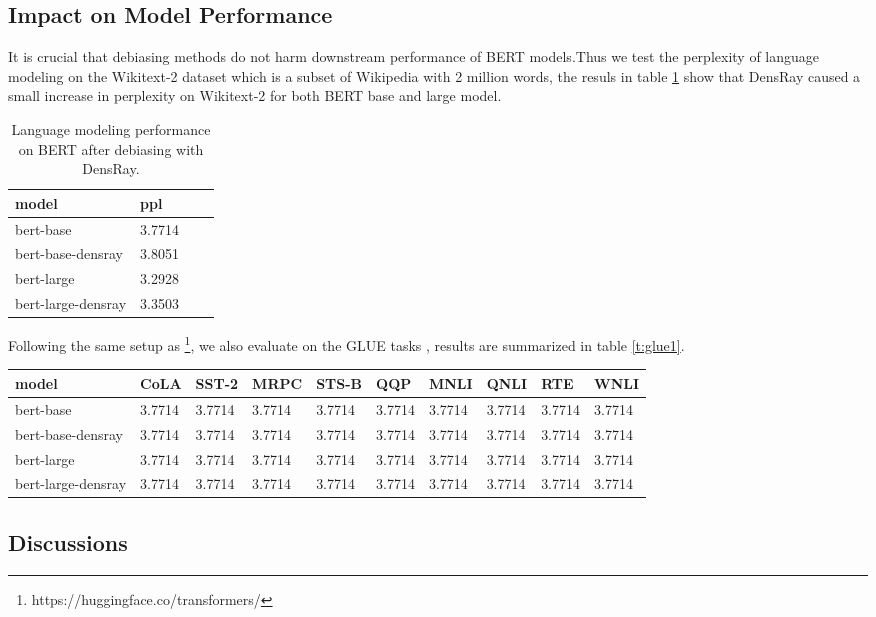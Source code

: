 \subsection{Impact on Model Performance}
It is crucial that debiasing methods do not harm downstream performance of BERT models.Thus we test the perplexity of language modeling on the Wikitext-2 dataset \citep{merity2016pointer} which is a subset of Wikipedia with 2 million words, the resuls in table \ref{t:ppl1} show that DensRay caused a small increase in perplexity on Wikitext-2 for both BERT base and large model.
\begin{table}[ht]
\centering
\begin{tabular}{llll}
\hline
model & ppl\\
\hline
bert-base & 3.7714\\
bert-base-densray & 3.8051\\
\hline
bert-large & 3.2928\\
bert-large-densray & 3.3503\\
\hline
\end{tabular}
\caption{\label{t:ppl1}
Language modeling performance on BERT after debiasing with DensRay.}
\end{table}

Following the same setup as \citet{wolf2019huggingfaces}\footnote{https://huggingface.co/transformers/}, we also evaluate on the GLUE tasks \citep{wang2018glue}, results are summarized in table \ref{t:glue1}. 
\begin{table*}[ht]
\centering
\begin{tabular}{llllllllll}
\hline
model & CoLA &SST-2&MRPC&STS-B&QQP&MNLI&QNLI&RTE&WNLI\\
\hline
bert-base & 3.7714& 3.7714& 3.7714& 3.7714& 3.7714& 3.7714& 3.7714& 3.7714& 3.7714\\
bert-base-densray & 3.7714& 3.7714& 3.7714& 3.7714& 3.7714& 3.7714& 3.7714& 3.7714& 3.7714\\
\hline
bert-large & 3.7714& 3.7714& 3.7714& 3.7714& 3.7714& 3.7714& 3.7714& 3.7714& 3.7714\\
bert-large-densray & 3.7714& 3.7714& 3.7714& 3.7714& 3.7714& 3.7714& 3.7714& 3.7714& 3.7714\\
\hline
\end{tabular}
\caption{\label{t:glue1}
GLUE tasks performance on BERT after debiasing with DensRay.}
\end{table*}

\subsection{Discussions}
